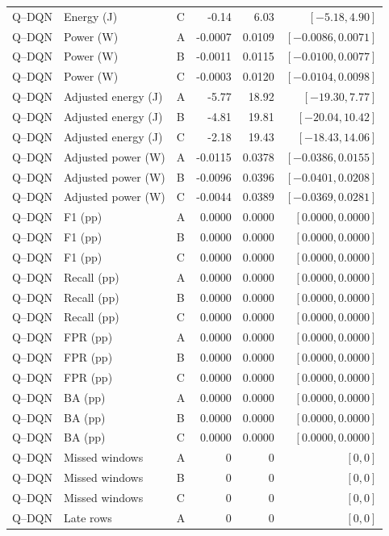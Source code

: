 \begin{longtable}{lllrrr}
Q--DQN & Energy (J) & C & -0.14 & 6.03 & $[-5.18,4.90]$\\
Q--DQN & Power (W) & A & -0.0007 & 0.0109 & $[-0.0086,0.0071]$\\
Q--DQN & Power (W) & B & -0.0011 & 0.0115 & $[-0.0100,0.0077]$\\
Q--DQN & Power (W) & C & -0.0003 & 0.0120 & $[-0.0104,0.0098]$\\
Q--DQN & Adjusted energy (J) & A & -5.77 & 18.92 & $[-19.30,7.77]$\\
Q--DQN & Adjusted energy (J) & B & -4.81 & 19.81 & $[-20.04,10.42]$\\
Q--DQN & Adjusted energy (J) & C & -2.18 & 19.43 & $[-18.43,14.06]$\\
Q--DQN & Adjusted power (W) & A & -0.0115 & 0.0378 & $[-0.0386,0.0155]$\\
Q--DQN & Adjusted power (W) & B & -0.0096 & 0.0396 & $[-0.0401,0.0208]$\\
Q--DQN & Adjusted power (W) & C & -0.0044 & 0.0389 & $[-0.0369,0.0281]$\\
Q--DQN & F1 (pp) & A & 0.0000 & 0.0000 & $[0.0000,0.0000]$\\
Q--DQN & F1 (pp) & B & 0.0000 & 0.0000 & $[0.0000,0.0000]$\\
Q--DQN & F1 (pp) & C & 0.0000 & 0.0000 & $[0.0000,0.0000]$\\
Q--DQN & Recall (pp) & A & 0.0000 & 0.0000 & $[0.0000,0.0000]$\\
Q--DQN & Recall (pp) & B & 0.0000 & 0.0000 & $[0.0000,0.0000]$\\
Q--DQN & Recall (pp) & C & 0.0000 & 0.0000 & $[0.0000,0.0000]$\\
Q--DQN & FPR (pp) & A & 0.0000 & 0.0000 & $[0.0000,0.0000]$\\
Q--DQN & FPR (pp) & B & 0.0000 & 0.0000 & $[0.0000,0.0000]$\\
Q--DQN & FPR (pp) & C & 0.0000 & 0.0000 & $[0.0000,0.0000]$\\
Q--DQN & BA (pp) & A & 0.0000 & 0.0000 & $[0.0000,0.0000]$\\
Q--DQN & BA (pp) & B & 0.0000 & 0.0000 & $[0.0000,0.0000]$\\
Q--DQN & BA (pp) & C & 0.0000 & 0.0000 & $[0.0000,0.0000]$\\
Q--DQN & Missed windows & A & 0 & 0 & $[0,0]$\\
Q--DQN & Missed windows & B & 0 & 0 & $[0,0]$\\
Q--DQN & Missed windows & C & 0 & 0 & $[0,0]$\\
Q--DQN & Late rows & A & 0 & 0 & $[0,0]$\\

\end{longtable}
